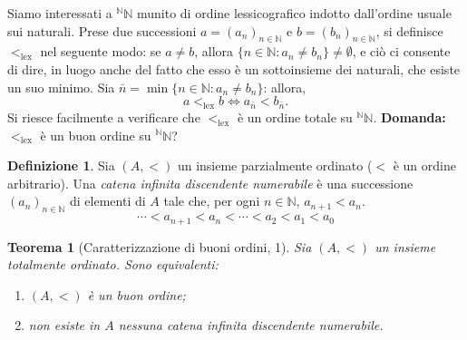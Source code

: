 \documentclass[fontsize = 11 pt, paper=A4, oneside, index=totoc, hyperref]{article}
\theoremstyle{definition}
\newtheorem{dfn}{Definizione}[section]
\theoremstyle{plain}
\newtheorem{thm}{Teorema}[section]
\newcommand{\N}{\mathbb{N}}
\begin{document}
Siamo interessati a \({}^\N\N\) munito di ordine lessicografico indotto dall'ordine usuale sui naturali. Prese due successioni \(a = (a_n)_{n \in \N}\) e \(b = (b_n)_{n \in \N}\), si definisce \(<_{\mathrm{lex}}\) nel seguente modo: se \(a \neq b\), allora \(\lbrace n \in \N \colon a_n \neq b_n\rbrace \neq \emptyset\), e ciò ci consente di dire, in luogo anche del fatto che esso è un sottoinsieme dei naturali, che esiste un suo minimo. Sia \(\bar{n} = \min \lbrace n \in \N \colon a_n \neq b_n \rbrace\): allora,
\[
a <_{\mathrm{lex}} b \iff a_{\bar{n}} < b_{\bar{n}}.
\]
Si riesce facilmente a verificare che \(<_{\mathrm{lex}}\) è un ordine totale su \({}^\N\N\). {\bf Domanda:} \(<_{\mathrm{lex}}\) è un buon ordine su \({}^\N\N\)?
\begin{dfn}
  Sia \((A, <)\) un insieme parzialmente ordinato (\(<\) è un ordine arbitrario). Una \emph{catena infinita discendente numerabile} è una successione \((a_n)_{n \in \N}\) di elementi di \(A\) tale che, per ogni \(n \in \N\), \(a_{n+1} < a_n\).
  \[
  \dotsb < a_{n+1} < a_n < \dotsb < a_2 < a_1 < a_0
  \]
\end{dfn}
\begin{thm}[Caratterizzazione di buoni ordini, 1]
  Sia \((A, <)\) un insieme totalmente ordinato. Sono equivalenti:
  \begin{enumerate}
    \item \((A,<)\) è un buon ordine;
    \item non esiste in \(A\) nessuna catena infinita discendente numerabile.
  \end{enumerate}
\end{thm}
\end{document}

